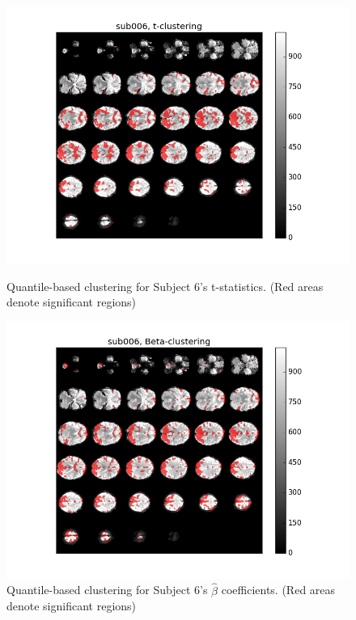 


\begin{figure}[H]
\centering
\begin{minipage}[b]{.66\linewidth}
	\centering
	\includegraphics[width=.8\linewidth]{../images/sub006_t_overlay.png} 
	\caption{Quantile-based clustering for Subject 6's t-statistics. 
	(Red areas denote significant regions)}
	\label{fig:clustert}
\end{minipage}	

\begin{minipage}[b]{.66\linewidth}
	\centering
		\includegraphics[width=.8\linewidth]{../images/sub006_beta_overlay.png} 
	\caption{Quantile-based clustering for Subject 6's $\hat{\beta}$ coefficients. 
	(Red areas denote significant regions)}
	\label{fig:clusterbeta}
\end{minipage}


\end{figure}
